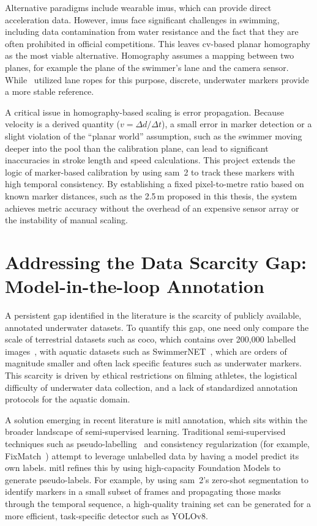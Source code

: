 Alternative paradigms include wearable \gls{imu}s, which can provide
direct acceleration data. However, \gls{imu}s face significant challenges in swimming, including data
contamination from water resistance and the fact that they are often prohibited in official
competitions. This leaves \gls{cv}-based planar homography as the most viable alternative. Homography
assumes a mapping between two planes, for example the plane of the swimmer's lane and the camera
sensor. While~\cite{Tran2024} utilized lane ropes for this purpose, discrete, underwater markers
provide a more stable reference.

A critical issue in homography-based scaling is error propagation. Because velocity is a derived
quantity ($v = \Delta d / \Delta t$), a small error in marker detection or a slight violation of
the ``planar world'' assumption, such as the swimmer moving deeper into the pool than the
calibration plane, can lead to significant inaccuracies in stroke length and speed calculations.
This project extends the logic of marker-based calibration by using \gls{sam}~2 to track these markers
with high temporal consistency. By establishing a fixed pixel-to-metre ratio based on known
marker distances, such as the 2.5\,m proposed in this thesis, the system achieves metric
accuracy without the overhead of an expensive sensor array or the instability of manual scaling.

\section{Addressing the Data Scarcity Gap: Model-in-the-loop Annotation}
A persistent gap identified in the literature is the scarcity of publicly available, annotated
underwater datasets. To quantify this gap, one need only compare the scale of terrestrial
datasets such as \gls{coco}, which contains over 200{,}000 labelled
images~\cite{lin2014microsoft}, with aquatic datasets such as
SwimmerNET~\cite{giulietti_swimmernet_2023}, which are orders of magnitude smaller and often
lack specific features such as underwater markers. This scarcity is driven by ethical
restrictions on filming athletes, the logistical difficulty of underwater data collection, and a
lack of standardized annotation protocols for the aquatic domain.

A solution emerging in recent literature is \gls{mitl} annotation, which sits
within the broader landscape of semi-supervised learning. Traditional semi-supervised techniques
such as pseudo-labelling~\cite{lee2013pseudo} and consistency regularization (for example,
FixMatch~\cite{sohn2020fixmatch}) attempt to leverage unlabelled data by having a model predict
its own labels. \gls{mitl} refines this by using high-capacity Foundation Models to generate
pseudo-labels. For example, by using \gls{sam}~2's zero-shot segmentation to identify markers in a
small subset of frames and propagating those masks through the temporal sequence, a high-quality
training set can be generated for a more efficient, task-specific detector such as YOLOv8.

